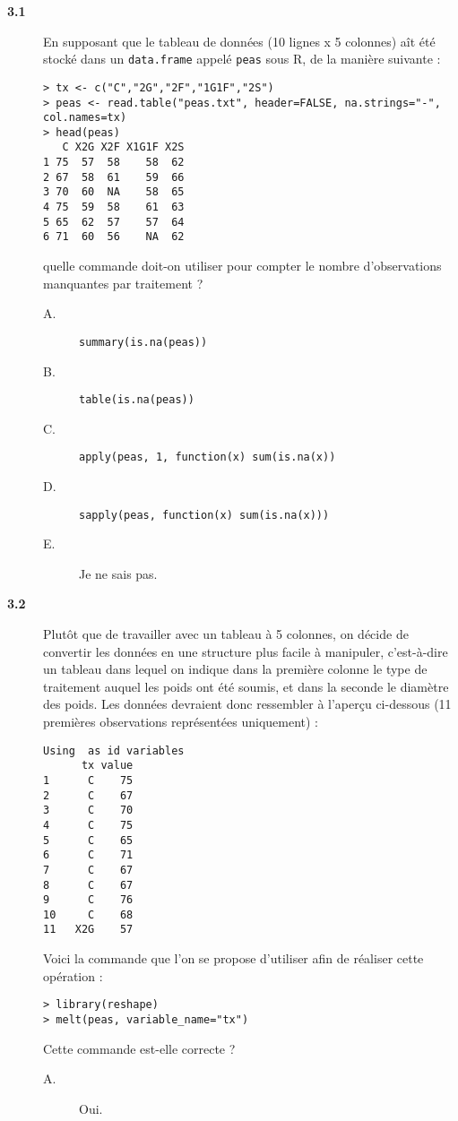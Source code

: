 \documentclass[11pt]{report}
\theoremstyle{definition}
\newcommand{\R}{\textsf{R}\xspace}
\begin{document}
\begin{description}
\item[\bf 3.1]  En supposant que le tableau de
  données (10 lignes x 5 colonnes) aît été stocké dans un
  \texttt{data.frame} appelé \texttt{peas} sous \R, de la manière suivante :
\begin{verbatim}
> tx <- c("C","2G","2F","1G1F","2S")
> peas <- read.table("peas.txt", header=FALSE, na.strings="-", col.names=tx)
> head(peas)
   C X2G X2F X1G1F X2S
1 75  57  58    58  62
2 67  58  61    59  66
3 70  60  NA    58  65
4 75  59  58    61  63
5 65  62  57    57  64
6 71  60  56    NA  62
\end{verbatim}
  quelle commande doit-on utiliser pour compter le nombre
  d'observations manquantes par traitement ? 
  \begin{description}
  \item[A.] \verb|summary(is.na(peas))|
  \item[B.] \verb|table(is.na(peas))|
  \item[C.] \verb|apply(peas, 1, function(x) sum(is.na(x))|
  \item[D.] \verb|sapply(peas, function(x) sum(is.na(x)))|
  \item[E.] Je ne sais pas.
  \end{description}  
\item[\bf 3.2]  Plutôt que de travailler avec un
  tableau à 5 colonnes, on décide de convertir les données en une structure
  plus facile à manipuler, c'est-à-dire un tableau dans lequel on indique
  dans la première colonne le type de traitement auquel les poids ont été
  soumis, et dans la seconde le diamètre des poids. Les données devraient
  donc ressembler à l'aperçu ci-dessous (11 premières observations
  représentées uniquement) :
\begin{verbatim}
Using  as id variables
      tx value
1      C    75
2      C    67
3      C    70
4      C    75
5      C    65
6      C    71
7      C    67
8      C    67
9      C    76
10     C    68
11   X2G    57
\end{verbatim}
  Voici la commande que l'on se propose d'utiliser afin de réaliser cette
  opération :
\begin{verbatim}
> library(reshape)
> melt(peas, variable_name="tx")
\end{verbatim}
  Cette commande est-elle correcte ? 
  \begin{description}
  \item[A.] Oui. 

\end{description}
\end{description}
\end{document}
